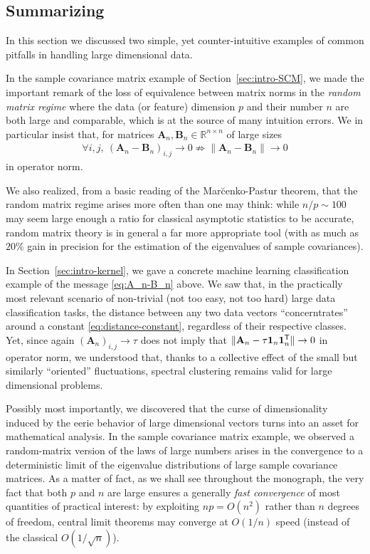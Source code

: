\documentclass[MAL,biber]{nowfnt} %
\newcommand{\T}{{\sf T}}
\newcommand{\A}{{\mathbf{A}}}
\newcommand{\B}{{\mathbf{B}}}
\newcommand{\one}{{\mathbf{1}}}
\newcommand{\RR}{{\mathbb{R}}}
\begin{document}
\subsection{Summarizing}

In this section we discussed two simple, yet counter-intuitive examples of common pitfalls in handling large dimensional data. 

In the sample covariance matrix example of Section~\ref{sec:intro-SCM}, we made the important remark of the loss of equivalence between matrix norms in the \emph{random matrix regime} where the data (or feature) dimension $p$ and their number $n$ are both large and comparable, which is at the source of many intuition errors. We in particular insist that, for matrices $\A_n,\B_n\in\RR^{n\times n}$ of large sizes
\begin{align}\label{eq:A_n-B_n}
    \forall i,j,~(\A_n-\B_n)_{i,j}\to 0 \not\Rightarrow \|\A_n-\B_n\|\to 0
\end{align}
in operator norm.

We also realized, from a basic reading of the Mar\u{c}enko-Pastur theorem, that the random matrix regime arises more often than one may think: while $n/p \sim 100$ may seem large enough a ratio for classical asymptotic statistics to be accurate, random matrix theory is in general a far more appropriate tool (with as much as $20\%$ gain in precision for the estimation of the eigenvalues of sample covariances). 

In Section~\ref{sec:intro-kernel}, we gave a concrete machine learning classification example of the message \eqref{eq:A_n-B_n} above. We saw that, in the practically most relevant scenario of non-trivial (not too easy, not too hard) large data classification tasks, the distance between any two data vectors ``concerntrates'' around a constant \eqref{eq:distance-constant}, regardless of their respective classes. Yet, since again $(\A_n)_{i,j}\to\tau$ does not imply that $\|\A_n-\tau \one_n \one_n^\T\|\to 0$ in operator norm, we understood that, thanks to a collective effect of the small but similarly ``oriented'' fluctuations, spectral clustering remains valid for large dimensional problems. 

\medskip

Possibly most importantly, we discovered that the curse of dimensionality induced by the eerie behavior of large dimensional vectors turns into an asset for mathematical analysis. In the sample covariance matrix example, we observed a random-matrix version of the laws of large numbers arises in the convergence to a deterministic limit of the eigenvalue distributions of large sample covariance matrices. As a matter of fact, as we shall see throughout the monograph, the very fact that both $p$ and $n$ are large ensures a generally \emph{fast convergence} of most quantities of practical interest: by exploiting $np=O(n^2)$ rather than $n$ degrees of freedom, central limit theorems may converge at $O(1/n)$ speed (instead of the classical $O(1/\sqrt{n})$). 
\end{document}
